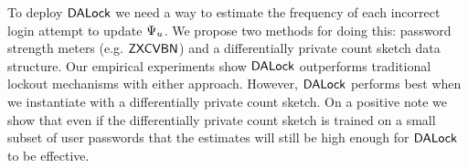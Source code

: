 To deploy $\mathsf{DALock}$ we need a way to estimate the frequency of each incorrect login attempt to update $\Psi_{u}$. We propose two methods for doing this: password strength meters (e.g. $\mathsf{ZXCVBN}$\cite{USENIX:Wheeler16}) and a differentially private count sketch data structure. Our empirical experiments show $\mathsf{DALock}$ outperforms traditional lockout mechanisms with either approach. However, $\mathsf{DALock}$ performs best when we instantiate with a differentially private count sketch. On a positive note we show that even if the differentially private count sketch is trained on a small subset of user passwords that the estimates will still be high enough for $\mathsf{DALock}$ to be effective.











